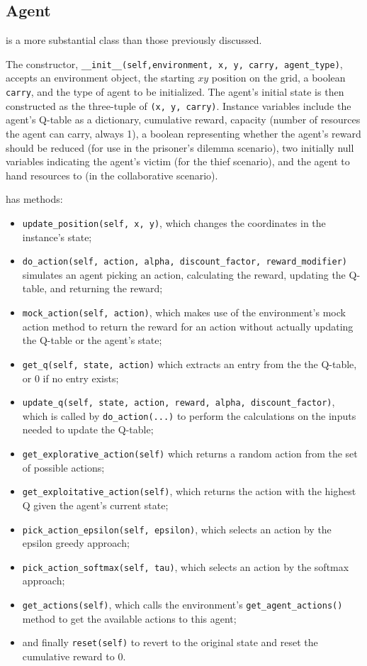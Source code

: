 \documentclass[11pt]{article}
\begin{document}
\subsection{Agent}

 is a more substantial class than those previously discussed.

The constructor, \texttt{__init__(self,environment, x, y, carry, agent_type)}, accepts an environment object, the starting $xy$ position on the grid, a boolean \texttt{carry}, and the type of agent to be initialized. The agent's initial state is then constructed as the three-tuple of \texttt{(x, y, carry)}. Instance variables include the agent's Q-table as a dictionary, cumulative reward, capacity (number of resources the agent can carry, always 1), a boolean representing whether the agent's reward should be reduced (for use in the prisoner's dilemma scenario), two initially null variables indicating the agent's victim (for the thief scenario), and the agent to hand resources to (in the collaborative scenario).

 has methods:
\begin{itemize}
\item \texttt{update_position(self, x, y)}, which changes the coordinates in the instance's state;
\item \texttt{do_action(self, action, alpha, discount_factor, reward_modifier)} simulates an agent picking an action, calculating the reward, updating the Q-table, and returning the reward;
\item \texttt{mock_action(self, action)}, which makes use of the environment's mock action method to return the reward for an action without actually updating the Q-table or the agent's state;
\item \texttt{get_q(self, state, action)} which extracts an entry from the the Q-table, or 0 if no entry exists;
\item \texttt{update_q(self, state, action, reward, alpha, discount_factor)}, which is called by \texttt{do_action(...)} to perform the calculations on the inputs needed to update the Q-table;
\item \texttt{get_explorative_action(self)} which returns a random action from the set of possible actions;
\item \texttt{get_exploitative_action(self)}, which returns the action with the highest Q given the agent's current state;
\item \texttt{pick_action_epsilon(self, epsilon)}, which selects an action by the epsilon greedy approach;
\item \texttt{pick_action_softmax(self, tau)}, which selects an action by the softmax approach;
\item \texttt{get_actions(self)}, which calls the environment's \texttt{get_agent_actions()} method to get the available actions to this agent;
\item and finally \texttt{reset(self)} to revert to the original state and reset the cumulative reward to 0.
\end{itemize}
\end{document}
